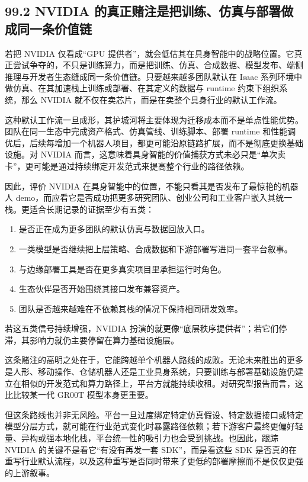 \subsection*{99.2 NVIDIA 的真正赌注是把训练、仿真与部署做成同一条价值链}


若把 NVIDIA 仅看成“GPU 提供者”，就会低估其在具身智能中的战略位置。它真正尝试争夺的，不只是训练算力，而是把训练、仿真、合成数据、模型发布、端侧推理与开发者生态缝成同一条价值链。只要越来越多团队默认在 Isaac 系列环境中做仿真、在其加速栈上训练或部署、在其定义的数据与 runtime 约束下组织系统，那么 NVIDIA 就不仅在卖芯片，而是在卖整个具身行业的默认工作流。

这种默认工作流一旦成形，其护城河将主要体现为迁移成本而不是单点性能优势。团队在同一生态中完成资产格式、仿真管线、训练脚本、部署 runtime 和性能调优后，后续每增加一个机器人项目，都更可能沿原链路扩展，而不是彻底更换基础设施。对 NVIDIA 而言，这意味着具身智能的价值捕获方式未必只是“单次卖卡”，更可能是通过持续绑定开发范式来提高整个行业的路径依赖。

因此，评价 NVIDIA 在具身智能中的位置，不能只看其是否发布了最惊艳的机器人 demo，而应看它是否成功把更多研究团队、创业公司和工业客户嵌入其统一栈。更适合长期记录的证据至少有五类：

\begin{enumerate}
\item {} 是否正在成为更多团队的默认仿真与数据回放入口。
\item \texttt{} 一类模型是否继续把上层策略、合成数据和下游部署写进同一套平台叙事。
\item \texttt{} 与边缘部署工具是否在更多真实项目里承担运行时角色。
\item 生态伙伴是否开始围绕其接口发布兼容资产。
\item 团队是否越来越难在不依赖其栈的情况下保持相同研发效率。
\end{enumerate}

若这五类信号持续增强，NVIDIA 扮演的就更像“底层秩序提供者”；若它们停滞，其影响力就仍主要停留在算力基础设施层。

这条赌注的高明之处在于，它能跨越单个机器人路线的成败。无论未来胜出的更多是人形、移动操作、仓储机器人还是工业具身系统，只要训练与部署基础设施仍建立在相似的开发范式和算力路径上，平台方就能持续收租。对研究型报告而言，这比比较某一代 GR00T 模型本身更重要。

但这条路线也并非无风险。平台一旦过度绑定特定仿真假设、特定数据接口或特定模型分层方式，就可能在行业范式变化时暴露路径依赖；若下游客户最终更偏好轻量、异构或强本地化栈，平台统一性的吸引力也会受到挑战。也因此，跟踪 NVIDIA 的关键不是看它“有没有再发一套 SDK”，而是看这些 SDK 是否真的在重写行业默认流程，以及这种重写是否同时带来了更低的部署摩擦而不是仅仅更强的上游叙事。

